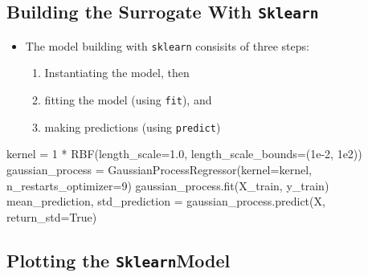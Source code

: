 \documentclass[
  letterpaper,
  DIV=11,
  numbers=noendperiod]{scrreprt}
\newenvironment{Shaded}{\begin{snugshade}}{\end{snugshade}}
\newcommand{\DecValTok}[1]{\textcolor[rgb]{0.68,0.00,0.00}{#1}}
\newcommand{\FloatTok}[1]{\textcolor[rgb]{0.68,0.00,0.00}{#1}}
\newcommand{\NormalTok}[1]{\textcolor[rgb]{0.00,0.23,0.31}{#1}}
\newcommand{\OperatorTok}[1]{\textcolor[rgb]{0.37,0.37,0.37}{#1}}
\newcommand{\VariableTok}[1]{\textcolor[rgb]{0.07,0.07,0.07}{#1}}
\providecommand{\tightlist}{%
  \setlength{\itemsep}{0pt}\setlength{\parskip}{0pt}}\usepackage{longtable,booktabs,array}
\begin{document}
\hypertarget{building-the-surrogate-with-sklearn}{%
\subsection{\texorpdfstring{Building the Surrogate With
\texttt{Sklearn}}{Building the Surrogate With Sklearn}}\label{building-the-surrogate-with-sklearn}}

\begin{itemize}
\tightlist
\item
  The model building with \texttt{sklearn} consisits of three steps:

  \begin{enumerate}
  \def\labelenumi{\arabic{enumi}.}
  \tightlist
  \item
    Instantiating the model, then
  \item
    fitting the model (using \texttt{fit}), and
  \item
    making predictions (using \texttt{predict})
  \end{enumerate}
\end{itemize}

\begin{Shaded}
\begin{Highlighting}[]
\NormalTok{kernel }\OperatorTok{=} \DecValTok{1} \OperatorTok{*}\NormalTok{ RBF(length\_scale}\OperatorTok{=}\FloatTok{1.0}\NormalTok{, length\_scale\_bounds}\OperatorTok{=}\NormalTok{(}\FloatTok{1e{-}2}\NormalTok{, }\FloatTok{1e2}\NormalTok{))}
\NormalTok{gaussian\_process }\OperatorTok{=}\NormalTok{ GaussianProcessRegressor(kernel}\OperatorTok{=}\NormalTok{kernel, n\_restarts\_optimizer}\OperatorTok{=}\DecValTok{9}\NormalTok{)}
\NormalTok{gaussian\_process.fit(X\_train, y\_train)}
\NormalTok{mean\_prediction, std\_prediction }\OperatorTok{=}\NormalTok{ gaussian\_process.predict(X, return\_std}\OperatorTok{=}\VariableTok{True}\NormalTok{)}
\end{Highlighting}
\end{Shaded}

\hypertarget{plotting-the-sklearnmodel}{%
\subsection{\texorpdfstring{Plotting the
\texttt{Sklearn}Model}{Plotting the SklearnModel}}\label{plotting-the-sklearnmodel}}
\end{document}
